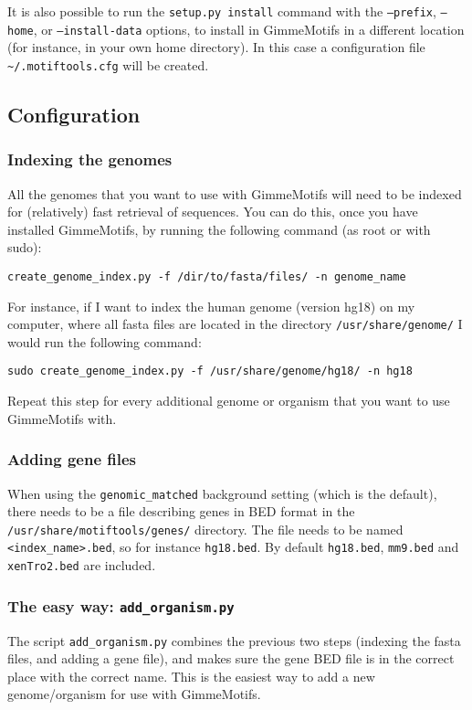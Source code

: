 \documentclass[10pt]{article}
\begin{document}
It is also possible to run the \texttt{setup.py install} command with the \texttt{--prefix}, \texttt{--home}, or \texttt{--install-data} options, to install in GimmeMotifs in a different location (for instance, in your own home directory). In this case a configuration file \texttt{\textasciitilde{}/.motiftools.cfg} will be created.

\subsection{Configuration}

\subsubsection{Indexing the genomes}
\label{sec:indexing}
All the genomes that you want to use with GimmeMotifs will need to be indexed for (relatively) fast retrieval of sequences. You can do this, once you have installed GimmeMotifs, by running the following command (as root or with sudo):
\begin{verbatim}
create_genome_index.py -f /dir/to/fasta/files/ -n genome_name
\end{verbatim}
For instance, if I want to index the human genome (version hg18) on my computer, where all fasta files are located in the directory \texttt{/usr/share/genome/} I would run the following command:
\begin{verbatim}
sudo create_genome_index.py -f /usr/share/genome/hg18/ -n hg18
\end{verbatim}
Repeat this step for every additional genome or organism that you want to use GimmeMotifs with.

\subsubsection{Adding gene files}
When using the \texttt{genomic\_matched} background setting (which is the default), there needs to be a file describing genes in BED format in the \texttt{/usr/share/motiftools/genes/} directory. The file needs to be named \texttt{<index\_name>.bed}, so for instance \texttt{hg18.bed}. By default \texttt{hg18.bed}, \texttt{mm9.bed} and \texttt{xenTro2.bed} are included.

\subsubsection{The easy way: \texttt{add\_organism.py}}
The script \texttt{add\_organism.py} combines the previous two steps (indexing the fasta files, and adding a gene file), and makes sure the gene BED file is in the correct place with the correct name. This is the easiest way to add a new genome/organism for use with GimmeMotifs.
\end{document}
